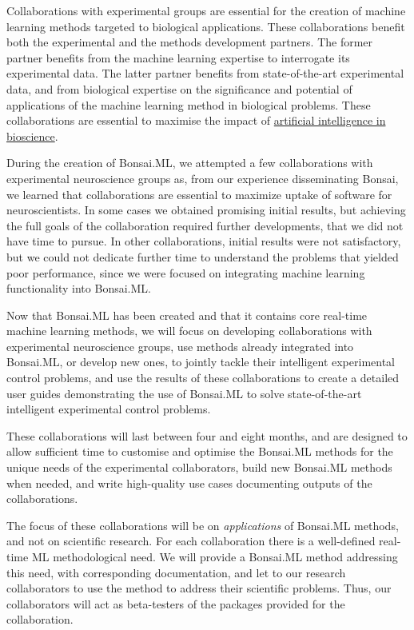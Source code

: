 Collaborations with experimental groups are essential for the creation of
machine learning methods targeted to biological applications. These
collaborations benefit both the experimental and the methods development
partners.
%
The former partner benefits from the machine learning expertise to interrogate its experimental data.
%
The latter partner benefits from state-of-the-art experimental
data, and from biological expertise on the significance and potential of applications of
the machine learning method in biological problems.
%
These collaborations are essential to maximise the impact of
\href{https://www.ukri.org/what-we-do/browse-our-areas-of-investment-and-support/artificial-intelligence-in-bioscience/}{artificial
intelligence in bioscience}.

During the creation of Bonsai.ML, we attempted a few collaborations with
experimental neuroscience groups as, from our experience disseminating Bonsai,
we learned that collaborations are essential to maximize uptake of software for
neuroscientists.
%
In some cases we obtained promising initial results, but achieving the full
goals of the collaboration required further developments, that we did not have
time to pursue.
%
In other collaborations, initial results were not satisfactory, but we could
not dedicate further time to understand the problems that yielded poor
performance, since we were focused on integrating machine learning
functionality into Bonsai.ML.

Now that Bonsai.ML has been created and that it contains core real-time machine
learning methods, we will focus on developing collaborations with experimental
neuroscience groups, use methods already integrated into Bonsai.ML, or develop
new ones, to jointly tackle their intelligent experimental control problems,
and use the results of these collaborations to create a detailed user guides
demonstrating the use of Bonsai.ML to solve state-of-the-art intelligent
experimental control problems.

%
These collaborations will last between four and eight months, and are designed
to allow sufficient time to customise and optimise the Bonsai.ML methods for the
unique needs of the experimental collaborators, build new Bonsai.ML methods when
needed, and write high-quality use cases documenting outputs of the
collaborations.

The focus of these collaborations will be on \emph{applications} of
Bonsai.ML methods, and not on scientific research.
%
For each collaboration there is a well-defined real-time ML methodological
need. We will provide a Bonsai.ML method addressing this need, with
corresponding documentation, and let to our research collaborators to use the
method to address their scientific problems. Thus, our collaborators will act
as beta-testers of the packages provided for the collaboration.

